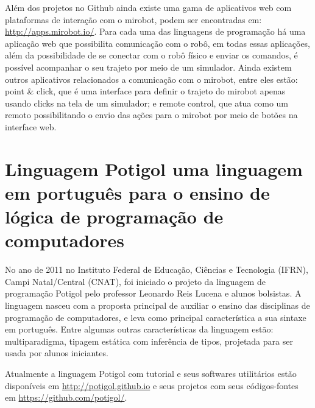 Além dos projetos no Github ainda existe uma gama de aplicativos web com
plataformas de interação com o mirobot, podem ser encontradas em:
\url{http://apps.mirobot.io/}. Para cada uma das linguagens de programação há uma aplicação web que possibilita comunicação com o robô, em todas
essas aplicações, além da possibilidade de se conectar com o robô físico e
enviar os comandos, é possível acompanhar o seu trajeto por meio de um
simulador.  Ainda existem outros aplicativos relacionados a comunicação com o
mirobot, entre eles estão: point \& click, que é uma interface para definir o
trajeto do mirobot apenas usando clicks na tela de um simulador; e remote
control, que atua como um remoto possibilitando o envio das ações para o
mirobot por meio de botões na interface web.

\section{Linguagem Potigol uma linguagem em português para o ensino de lógica
de programação de computadores}
\label{sec:potigol}

No ano de 2011 no Instituto Federal de Educação, Ciências e Tecnologia (IFRN),
Campi Natal/Central (CNAT), foi iniciado o projeto da linguagem de programação
Potigol pelo professor Leonardo Reis Lucena e alunos bolsistas. A linguagem
nasceu com a proposta principal de auxiliar o ensino das disciplinas de
programação de computadores, e leva como principal característica a sua sintaxe
em português. Entre algumas outras características da linguagem estão: multiparadigma, tipagem estática com inferência de tipos, projetada para ser
usada por alunos iniciantes.

Atualmente a linguagem Potigol com tutorial e seus softwares utilitários estão disponíveis em \url{http://potigol.github.io} e seus projetos com seus códigos-fontes em \url{https://github.com/potigol/}.

